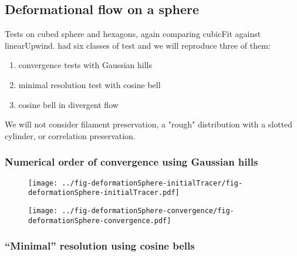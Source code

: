 \subsection{Deformational flow on a sphere}


Tests on cubed sphere and hexagons, again comparing cubicFit against linearUpwind.  \citet{lauritzen2012} had six classes of test and we will reproduce three of them:
\begin{enumerate}
	\item convergence tests with Gaussian hills
	\item minimal resolution test with cosine bell
	\item cosine bell in divergent flow
\end{enumerate}
We will not consider filament preservation, a "rough" distribution with a slotted cylinder, or correlation preservation.

\subsubsection{Numerical order of convergence using Gaussian hills}
\begin{figure}
	\texttt{[image: ../fig-deformationSphere-initialTracer/fig-deformationSphere-initialTracer.pdf]}
	\caption{}
\end{figure}

\begin{figure}
	\texttt{[image: ../fig-deformationSphere-convergence/fig-deformationSphere-convergence.pdf]}
	\caption{}
\end{figure}

\subsubsection{``Minimal'' resolution using cosine bells}

